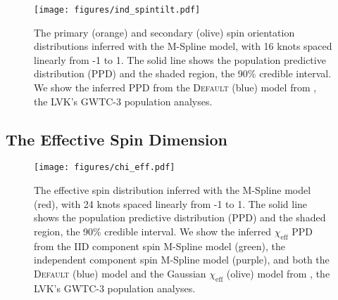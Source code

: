 \begin{figure}
    \begin{centering}
        \texttt{[image: figures/ind\_spintilt.pdf]}
        \caption{The primary (orange) and secondary (olive) spin orientation distributions inferred with the M-Spline model, 
        with 16 knots spaced linearly from -1 to 1. The solid line shows the population predictive distribution (PPD) and the shaded region, the 90\% credible interval. 
        We show the inferred PPD from the \textsc{Default} (blue) model from \citet{o3b_astro_dist}, the LVK's GWTC-3 population analyses.}
        \label{fig:ind_spintilt_dist}
    \end{centering}
\end{figure}

\subsection{The Effective Spin Dimension}

\begin{figure} 
    \begin{centering}
        \texttt{[image: figures/chi\_eff.pdf]}
        \caption{The effective spin distribution inferred with the M-Spline model (red), with 24 knots spaced linearly from -1 to 1. 
        The solid line shows the population predictive distribution (PPD) and the shaded region, the 90\% credible interval. We show the inferred $\chi_\mathrm{eff}$ 
        PPD from the IID component spin M-Spline model (green), the independent component spin M-Spline model (purple), 
        and both the \textsc{Default} (blue) model and the Gaussian $\chi_\mathrm{eff}$ (olive) model from \citet{o3b_astro_dist}, the LVK's GWTC-3 population analyses.}
        \label{fig:chieff_dist}
    \end{centering}
\end{figure}

